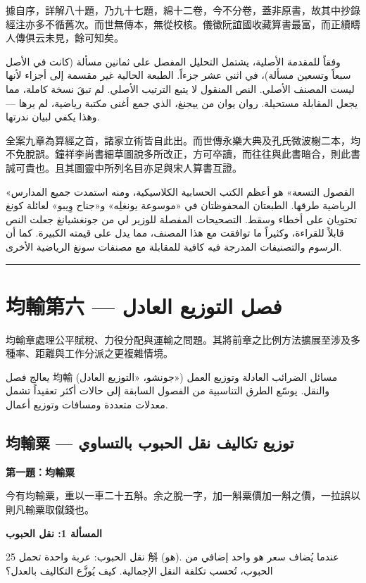 \documentclass[11pt,a4paper]{article}
\newcommand{\ar}[1]{\arabicfont\beginR #1\endR}
\newcommand{\longline}{\noindent\rule{\textwidth}{0.4pt}}
\newcommand{\ChinCol}[1]{\begin{minipage}[t]{0.48\textwidth}#1\end{minipage}}
\newcommand{\ArabCol}[1]{\begin{minipage}[t]{0.48\textwidth}\arabicfont\beginR #1\endR\end{minipage}}
\newcommand{\parallelsection}[2]{%
  \noindent\ChinCol{#1}\hfill\ArabCol{#2}\par\vspace{0.5cm}%
}
\newcounter{probnum}
\begin{document}
\parallelsection{%
據自序，詳解八十題，乃九十七題，綿十二卷，今不分卷，蓋非原書，故其中抄錄經注亦多不循舊次。而世無傳本，無從校核。儀徵阮誼國收藏算書最富，而正續疇人傳俱云未見，餘可知矣。%
}{%
وفقاً للمقدمة الأصلية، يشتمل التحليل المفصل على ثمانين مسألة (كانت في الأصل سبعاً وتسعين مسألة)، في اثني عشر جزءاً. الطبعة الحالية غير مقسمة إلى أجزاء لأنها ليست المصنف الأصلي. النص المنقول لا يتبع الترتيب الأصلي. لم تبقَ نسخة كاملة، مما يجعل المقابلة مستحيلة. روان يوان من ييجنغ، الذي جمع أغنى مكتبة رياضية، لم يرها --- وهذا يكفي لبيان ندرتها.%
}

\parallelsection{%
全案九章為算經之首，諸家立術皆自此出。而世傳永樂大典及孔氏微波榭二本，均不免脫誤。鐘祥李尚書細草圖說多所改正，方可卒讀，而往往與此書暗合，則此書誠可貴也。且其圖靈中所列名目亦足與宋人算書互證。%
}{%
«الفصول التسعة» هو أعظم الكتب الحسابية الكلاسيكية، ومنه استمدت جميع المدارس الرياضية طرقها. الطبعتان المحفوظتان في «موسوعة يونغلِه» و«جناح وِيبو» لعائلة كونغ تحتويان على أخطاء وسقط. التصحيحات المفصلة للوزير لي من جونغشيانغ جعلت النص قابلاً للقراءة، وكثيراً ما توافقت مع هذا المصنف، مما يدل على قيمته الكبيرة. كما أن الرسوم والتصنيفات المدرجة فيه كافية للمقابلة مع مصنفات سونغ الرياضية الأخرى.%
}

\vspace{1cm}
\longline

\newpage

\setcounter{probnum}{0}

\section{均輸第六 --- \ar{فصل التوزيع العادل}}
\label{sec:junshu}

\parallelsection{%
均輸章處理公平賦稅、力役分配與運輸之問題。其將前章之比例方法擴展至涉及多種率、距離與工作分派之更複雜情境。%
}{%
يعالج فصل 均輸 (جونشو، «التوزيع العادل») مسائل الضرائب العادلة وتوزيع العمل والنقل. يوسّع الطرق التناسبية من الفصول السابقة إلى حالات أكثر تعقيداً تشمل معدلات متعددة ومسافات وتوزيع أعمال.%
}

\subsection{均輸粟 --- \ar{توزيع تكاليف نقل الحبوب بالتساوي}}

\parallelsection{%
\noindent\textbf{第一題：均輸粟}

今有均輸粟，重以一車二十五斛。余之脫一字，加一斛粟價加一斛之價，一拉誤以則凡輸粟取僦錢也。%
}{%
\textbf{المسألة 1: نقل الحبوب}

نقل الحبوب: عربة واحدة تحمل 25 斛 (هو). عندما يُضاف سعر هو واحد إضافي من الحبوب، تُحسب تكلفة النقل الإجمالية. كيف يُوزَّع التكاليف بالعدل؟%
}
\end{document}
